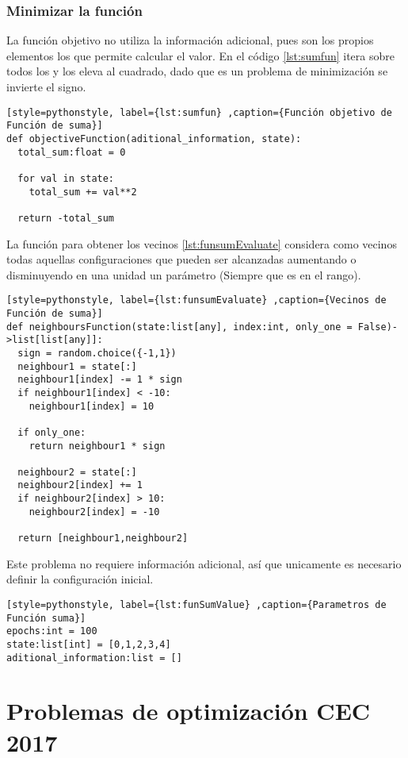 \documentclass[12pt,twoside]{article}
\begin{document}
\clearpage
\subsubsection{Minimizar la función}

La función objetivo no utiliza la información adicional, pues son los propios elementos los que permite calcular el valor. En el código \ref{lst:sumfun} itera sobre todos los y los eleva al cuadrado, dado que es un problema de minimización se invierte el signo.

\begin{lstlisting}[style=pythonstyle, label={lst:sumfun} ,caption={Función objetivo de Función de suma}]
def objectiveFunction(aditional_information, state):
  total_sum:float = 0

  for val in state:
    total_sum += val**2

  return -total_sum
\end{lstlisting}

La función para obtener los vecinos \ref{lst:funsumEvaluate} considera como vecinos todas aquellas configuraciones que pueden ser alcanzadas aumentando o disminuyendo en una unidad un parámetro (Siempre que es en el rango).

\begin{lstlisting}[style=pythonstyle, label={lst:funsumEvaluate} ,caption={Vecinos de Función de suma}]
def neighboursFunction(state:list[any], index:int, only_one = False)->list[list[any]]:
  sign = random.choice({-1,1})
  neighbour1 = state[:]
  neighbour1[index] -= 1 * sign
  if neighbour1[index] < -10:
    neighbour1[index] = 10 

  if only_one:
    return neighbour1 * sign

  neighbour2 = state[:]
  neighbour2[index] += 1
  if neighbour2[index] > 10:
    neighbour2[index] = -10 

  return [neighbour1,neighbour2]
\end{lstlisting}

Este problema no requiere información adicional, así que unicamente es necesario definir la configuración inicial.

\begin{lstlisting}[style=pythonstyle, label={lst:funSumValue} ,caption={Parametros de Función suma}]
epochs:int = 100
state:list[int] = [0,1,2,3,4]
aditional_information:list = []
\end{lstlisting}

\section{Problemas de optimización CEC 2017}
\end{document}
